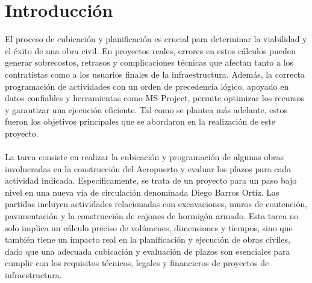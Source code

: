 \section{Introducción}
El proceso de cubicación y planificación es crucial para determinar la viabilidad y el éxito de una obra civil. En proyectos reales, errores en estos cálculos pueden generar sobrecostos, retrasos y complicaciones técnicas que afectan tanto a los contratistas como a los usuarios finales de la infraestructura. Además, la correcta programación de actividades con un orden de precedencia lógico, apoyado en datos confiables y herramientas como MS Project, permite optimizar los recursos y garantizar una ejecución eficiente. Tal como se plantea más adelante, estos fueron los objetivos principales que se abordaron en la realización de este proyecto.
\\ \\
La tarea consiste en realizar la cubicación y programación de algunas obras involucradas en la construcción del Aeropuerto y evaluar los plazos para cada actividad indicada. Específicamente, se trata de un proyecto para un paso bajo nivel en una nueva vía de circulación denominada Diego Barros Ortiz. Las partidas incluyen actividades relacionadas con excavaciones, muros de contención, pavimentación y la construcción de cajones de hormigón armado. Esta tarea no solo implica un cálculo preciso de volúmenes, dimensiones y tiempos, sino que también tiene un impacto real en la planificación y ejecución de obras civiles, dado que una adecuada cubicación y evaluación de plazos son esenciales para cumplir con los requisitos técnicos, legales y financieros de proyectos de infraestructura. 
